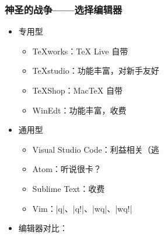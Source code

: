 \begin{frame}[fragile]
\frametitle{神圣的战争——选择编辑器}
\begin{itemize}
  \item<+-> 专用型

    \begin{itemize}
      \item TeXworks：\TeX{} Live 自带 \faWindows{} \faApple{} \faLinux{}
      \item TeXstudio：功能丰富，对新手友好 \faWindows{} \faApple{} \faLinux{}
      \item TeXShop：Mac\TeX{} 自带 \faApple{}
      \item WinEdt：功能丰富，收费 \faWindows{}
    \end{itemize}

  \item<+-> 通用型

    \begin{itemize}
      \item Visual Studio Code：利益相关（逃
      \item Atom：听说很卡？
      \item Sublime Text：收费
      \item Vim：|q|、|q!|、|wq|、|wq!|
    \end{itemize}

  \item<+-> 编辑器对比：
\end{itemize}
\end{frame}
